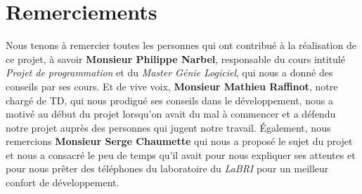 \chapter*{Remerciements}

Nous tenons à remercier toutes les personnes qui ont contribué à la réalisation de ce projet, à savoir \textbf{Monsieur Philippe Narbel}, responsable du cours intitulé \textit{Projet de programmation} et du \textit{Master Génie Logiciel}, qui nous a donné des conseils par ses cours. Et de vive voix, \textbf{Monsieur Mathieu Raffinot}, notre chargé de TD, qui nous prodigué ses conseils dans le développement, nous a motivé au début du projet lorsqu'on avait du mal à commencer et a défendu notre projet auprès des personnes qui jugent notre travail. Également, nous remercions \textbf{Monsieur Serge Chaumette} qui nous a proposé le sujet du projet et nous a consacré le peu de temps qu'il avait pour nous expliquer ses attentes et pour nous prêter des téléphones du laboratoire du \textit{LaBRI} pour un meilleur confort de développement.